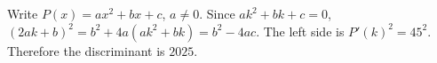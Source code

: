 Write $P(x)=ax^2+bx+c$, $a\ne0$. Since $ak^2+bk+c=0$, $(2ak+b)^2=b^2+4a(ak^2+bk)=b^2-4ac$. The left side is $P\prime(k)^2=45^2$. Therefore the discriminant is $\boxed{2025}$.
